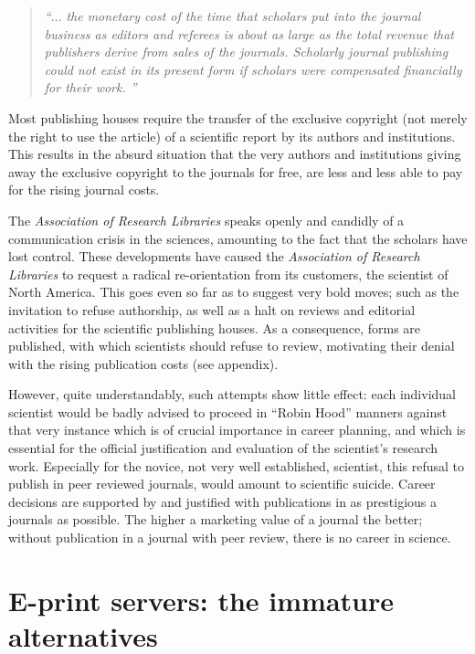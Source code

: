 \begin{quote} {\em ``$\ldots$ the monetary cost of the time that
scholars put into the journal business as editors and referees is about
as large as the total revenue that publishers derive from sales of the
journals.  Scholarly journal publishing could not exist in its present
form if scholars were compensated financially for their work.  ''}
\end{quote}

Most publishing houses require the transfer of the exclusive copyright
(not merely the right to use the article) of a scientific report by its
authors and institutions.  This results in the absurd situation that the
very authors and institutions giving away the exclusive copyright to the
journals for free, are less and less able to pay for the rising journal
costs.

The {\it
Association of Research Libraries} speaks openly and candidly of a
communication crisis in the sciences, amounting to the fact that the
scholars have lost control.
These developments have caused the {\it Association of Research Libraries}
to request a radical re-orientation from its customers, the scientist of
North America.
This goes even so far as to suggest very bold moves;
such as the invitation to refuse authorship, as well as a halt on reviews and
editorial activities for the scientific publishing houses.
As a consequence, forms are published, with
which scientists should refuse to review, motivating their denial with
the rising publication costs (see appendix).

However, quite understandably, such attempts show little effect:
each individual scientist would be badly advised to proceed in ``Robin
Hood'' manners  against that very instance which is of crucial
importance in career planning, and which is essential for the official
justification and evaluation of the scientist's research work.
Especially for the novice, not very well established, scientist, this
refusal to publish in peer reviewed journals, would amount to scientific
suicide.  Career decisions are supported by and justified
with publications in as prestigious a journals as
possible.  The higher a marketing value of a journal the better; without
publication in a journal with peer review, there is no career in
science.


\section{E-print servers:  the immature alternatives}

